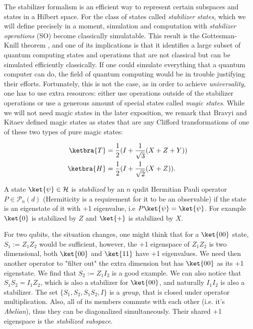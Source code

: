 The stabilizer formalism is an efficient way to represent certain subspaces and states in a Hilbert space. For the class of states called \textit{stabilizer states}, which we will define precisely in a moment, simulation and computation with \textit{stabilizer operations} (SO) become classically simulatable. This result is the Gottesman-Knill theorem \cite{gottesman_stabilizer_1997}, and one of its implications is that it identifies a large subset of quantum computing states and operations that are not classical but can be simulated efficiently classically. If one could simulate everything that a quantum computer can do, the field of quantum computing would be in trouble justifying their efforts. Fortunately, this is not the case, as in order to achieve \textit{universality}, one has to use extra resources: either use operations outside of the stabilizer operations or use a generous amount of special states called \textit{magic states}. While we will not need magic states in the later exposition, 
 we remark that Bravyi and Kitaev \cite{bravyi_universal_2005} defined magic states as states that are any Clifford transformations of one of these two types of pure magic states: 

\begin{align*}
\ketbra{T} &= \frac{1}{2}(I + \frac{1}{\sqrt{3}}(X+Z+Y)) \\
\ketbra{H} &= \frac{1}{2}(I + \frac{1}{\sqrt{2}}(X+Z)).
\end{align*}

A state $\ket{\psi} \in \mathcal{H}$ is \textit{stabilized} by an $n$ qudit Hermitian Pauli operator $P \in \mathcal{P}_n(d)$ (Hermiticity is a requirement for it to be an observable) if the state is an eigenstate of it with +1 eigenvalue, i.e $P\ket{\psi} = \ket{\psi}$. For example $\ket{0}$ is stabilized by $Z$ and $\ket{+}$ is stabilized by $X$. 

For two qubits, the situation changes, one might think that for a $\ket{00}$ state, $S_1:=Z_1Z_2$ would be sufficient, however, the +1 eigenspace of $Z_1Z_2$ is two dimensional, both $\ket{00}$ and $\ket{11}$ have +1 eigenvalues. We need then another operator to "filter out" the extra dimension but has $\ket{00}$ as its +1 eigenstate. We find that $S_2:=Z_1I_2$ is a good example. We can also notice that $S_1S_2 = I_1Z_2$, which is also a stabilizer for $\ket{00}$, and naturally $I_1I_2$ is also a stabilizer. The set $\{S_1, S_2, S_1S_2, I\}$ is a \textit{group}, that is closed under operator multiplication. Also, all of its members commute with each other (i.e. it's \textit{Abelian}), thus they can be diagonalized simultaneously. Their shared +1 eigenspace is the \textit{stabilized subspace}. 

